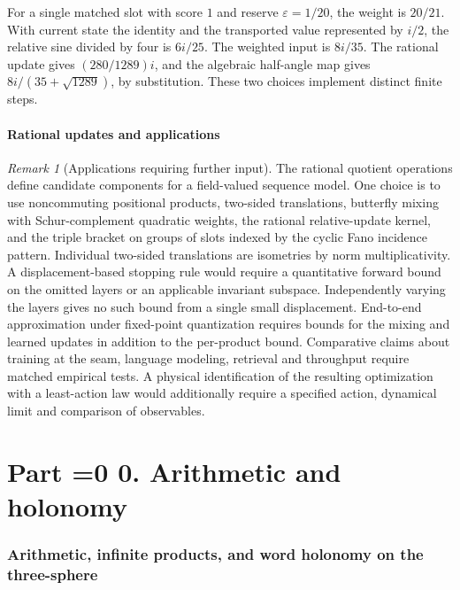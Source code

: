 \documentclass[11pt,reqno]{amsart}
\theoremstyle{definition}
\theoremstyle{remark}
\newtheorem{remark}[theorem]{Remark}
\numberwithin{equation}{section}
\newcounter{ppart}
\renewcommand{\theppart}{\ifnum\value{ppart}=0 0\else\Roman{ppart}\fi}
\newcommand{\paperpart}[2]{\refstepcounter{ppart}\part*{Part \theppart. #2}\label{#1}}
\begin{document}
For a single matched slot with score $1$ and reserve $\varepsilon=1/20$, the weight is $20/21$. With current state the identity and the transported value represented by $i/2$, the relative sine divided by four is $6i/25$. The weighted input is $8i/35$. The rational update gives $(280/1289)i$, and the algebraic half-angle map gives $8i/(35+\sqrt{1289})$, by substitution. These two choices implement distinct finite steps.

\subsection{Rational updates and applications}

\begin{remark}[Applications requiring further input]\label{m4:programme}
The rational quotient operations define candidate components for a field-valued sequence model. One choice is to use noncommuting positional products, two-sided translations, butterfly mixing with Schur-complement quadratic weights, the rational relative-update kernel, and the triple bracket on groups of slots indexed by the cyclic Fano incidence pattern. Individual two-sided translations are isometries by norm multiplicativity. A displacement-based stopping rule would require a quantitative forward bound on the omitted layers or an applicable invariant subspace. Independently varying the layers gives no such bound from a single small displacement. End-to-end approximation under fixed-point quantization requires bounds for the mixing and learned updates in addition to the per-product bound. Comparative claims about training at the seam, language modeling, retrieval and throughput require matched empirical tests. A physical identification of the resulting optimization with a least-action law would additionally require a specified action, dynamical limit and comparison of observables.
\end{remark}

\setcounter{section}{10}
\renewcommand{\thesection}{\arabic{section}}
\renewcommand{\theHsection}{\arabic{section}}

\paperpart{part:arith}{Arithmetic and holonomy}

\setcounter{section}{1}
\renewcommand{\thesection}{10\Alph{section}}
\renewcommand{\theHsection}{arith.\arabic{section}}
\section{Arithmetic, infinite products, and word holonomy on the three-sphere}
\label{sec:m6}
\end{document}
